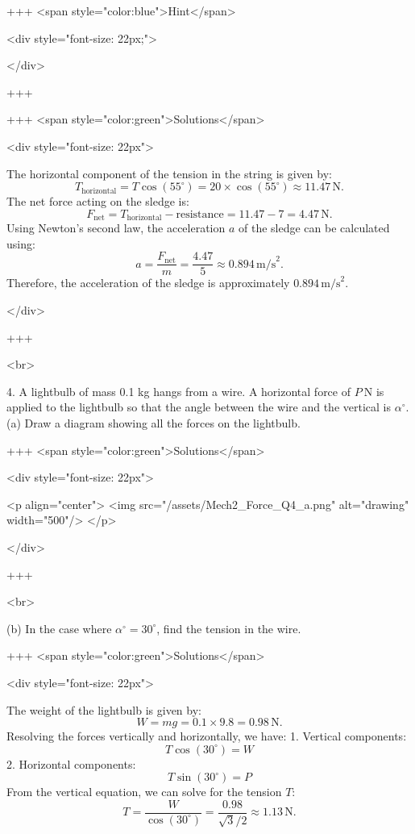 +++ <span style="color:blue">Hint</span>

<div style="font-size: 22px;">

</div>

+++

+++ <span style="color:green">Solutions</span>

<div style="font-size: 22px">

The horizontal component of the tension in the string is given by:
\[T_{\text{horizontal}} = T \cos(55^\circ) = 20 \times \cos(55^\circ) \approx 11.47 \, \text{N}.\]
The net force acting on the sledge is:
\[F_{\text{net}} = T_{\text{horizontal}} - \text{resistance} = 11.47 - 7 = 4.47 \, \text{N}.\]
Using Newton's second law, the acceleration \(a\) of the sledge can be calculated using:
\[a = \frac{F_{\text{net}}}{m} = \frac{4.47}{5} \approx 0.894 \, \text{m/s}^2.\]
Therefore, the acceleration of the sledge is approximately \(0.894 \, \text{m/s}^2\).

</div>

+++

<br>


4. A lightbulb of mass 0.1 kg hangs from a wire. A horizontal force of $P \mathrm{~N}$ is applied to the lightbulb so that the angle between the wire and the vertical is $\alpha^{\circ}$.
(a) Draw a diagram showing all the forces on the lightbulb.

+++ <span style="color:green">Solutions</span>

<div style="font-size: 22px">

<p align="center">
<img src="/assets/Mech2_Force_Q4_a.png" alt="drawing" width="500"/>
</p>

</div>

+++

<br>



(b) In the case where $\alpha^{\circ}=30^{\circ}$, find the tension in the wire.

+++ <span style="color:green">Solutions</span>

<div style="font-size: 22px">

The weight of the lightbulb is given by:
\[W = mg = 0.1 \times 9.8 = 0.98 \, \text{N}.\]
Resolving the forces vertically and horizontally, we have:
1. Vertical components:
\[T \cos(30^\circ) = W\]
2. Horizontal components:
\[T \sin(30^\circ) = P\]
From the vertical equation, we can solve for the tension \(T\):
\[T = \frac{W}{\cos(30^\circ)} = \frac{0.98}{\sqrt{3}/2} \approx 1.13 \, \text{N}.\]


